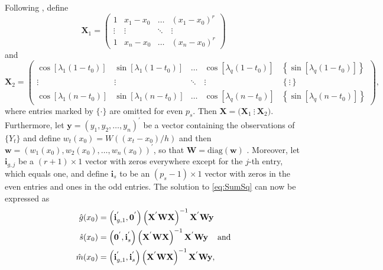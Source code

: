 Following \citet{feng2013seasonal}, define
\begin{equation}
\mathbf{X}_1 = 
\begin{pmatrix}
1 & x_1 - x_0 & \dots & (x_1-x_0)^r\\
\vdots & \vdots & \ddots & \vdots\\
1 & x_n - x_0 & \dots & (x_n-x_0)^r
\end{pmatrix}
\label{eq:xmat1}
\end{equation}
and
\begin{equation}
\mathbf{X}_2 = 
\begin{pmatrix}
\cos[\lambda_1(1-t_0)] & \sin[\lambda_1(1-t_0)] & \dots & \cos[\lambda_q(1-t_0)] & \left\{\sin[\lambda_q(1-t_0)]\right\} \\
\vdots & \vdots & \ddots & \vdots & \left\{\vdots\right\}\\
\cos[\lambda_1(n-t_0)] & \sin[\lambda_1(n-t_0)] & \dots & \cos[\lambda_q(n-t_0)] & \left\{\sin[\lambda_q(n-t_0)]\right\}
\end{pmatrix},
\label{eq:xmat2}
\end{equation}
where entries marked by \(\{\cdot\}\) are omitted for even \(p_s\). Then \(\mathbf{X}=\big(\mathbf{X}_1 \ \vdots \ \mathbf{X}_2\big)\). Furthermore, let \(\mathbf{y}=\left(y_1,y_2,\dots,y_n\right)^{'}\) be a vector containing the observations of \(\{Y_t\}\) and define \(w_{t}(x_0)=W\left((x_t - x_0)/h\right)\) and then \(\mathbf{w}=(w_1(x_0),w_2(x_0),\dots,w_n(x_0))^{'}\), so that \(\mathbf{W}=\text{diag}(\mathbf{w})\) \citep{feng2013seasonal}. Moreover, let \(\mathbf{i}_{g,j}\) be a \((r+1)\times 1\) vector with zeros everywhere except for the \(j\)-th entry, which equals one, and define \(\mathbf{i}_s\) to be an \((p_s - 1)\times 1\) vector with zeros in the even entries and ones in the odd entries. The solution to \eqref{eq:SumSq} can now be expressed as
\begin{align}
\hat g(x_0) &= \left(\mathbf{i}_{g,1}^{'},\mathbf{0}^{'}\right)\left(\mathbf{X}^{'}\mathbf{W}\mathbf{X}\right)^{-1}\mathbf{X}^{'}\mathbf{W}\mathbf{y}\label{eq:sol1}\\
\hat s(x_0) &= \left(\mathbf{0}^{'},\mathbf{i}_{s}^{'}\right)\left(\mathbf{X}^{'}\mathbf{W}\mathbf{X}\right)^{-1}\mathbf{X}^{'}\mathbf{W}\mathbf{y} \hspace{4mm}\text{and}\label{eq:sol2}\\
\hat m(x_0) &= \left(\mathbf{i}_{g,1}^{'},\mathbf{i}_{s}^{'}\right)\left(\mathbf{X}^{'}\mathbf{W}\mathbf{X}\right)^{-1}\mathbf{X}^{'}\mathbf{W}\mathbf{y},\label{eq:sol3}
\end{align}
